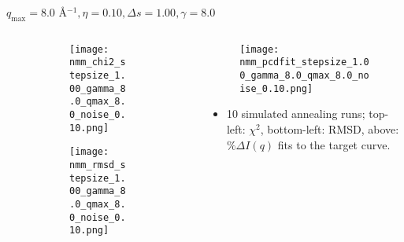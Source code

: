 \documentclass{beamer}
\begin{document}
\begin{frame}{$ q_{\textrm{max}}=8.0 $ \AA $^{-1}, \eta=0.10, \Delta s=1.00, \gamma=8.0$}
	\begin{columns}
		\begin{column}{.5\textwidth}
			\begin{figure}[H]
			\centering
			\begin{subfigure}[b]{\textwidth}
				\centering
				\texttt{[image: nmm\_chi2\_stepsize\_1.00\_gamma\_8.0\_qmax\_8.0\_noise\_0.10.png]}
				\label{fig:}
			\end{subfigure}
			\begin{subfigure}[b]{\textwidth}
				\centering
				\texttt{[image: nmm\_rmsd\_stepsize\_1.00\_gamma\_8.0\_qmax\_8.0\_noise\_0.10.png]}
				\label{fig:}
			\end{subfigure}
			\end{figure}
		\end{column}
		\begin{column}{.5\textwidth}
			\begin{figure}[H]
				\centering
				\texttt{[image: nmm\_pcdfit\_stepsize\_1.00\_gamma\_8.0\_qmax\_8.0\_noise\_0.10.png]}
				\label{fig:}
			\end{figure}
			\begin{itemize}
				\item 10 simulated annealing runs; top-left: $\chi^2$, bottom-left: RMSD, above: $\%\Delta I(q)$ fits to the target curve.
			\end{itemize}
		\end{column}
	\end{columns}
\end{frame}
 
\end{document}

